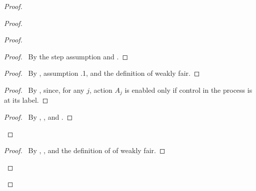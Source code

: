 \documentclass[fleqn,leqno]{article}
\begin{document}
\begin{proof}
\begin{proof}
\begin{proof}
    \begin{proof}
    \pf\ By the step  assumption and .
    \end{proof}
\vspace{.2em}

    \begin{proof}
    \pf\ By , assumption .1, and 
     the definition of weakly fair.
    \end{proof}

\vspace{.2em}
     \begin{proof}
     \pf\ By , since, for any $j$, action $A_{j}$ is enabled
    only if control in the process is at its label.
     \end{proof}
\vspace{.2em}
    \qedstep
      \begin{proof}
      \pf\ By , , and .
      \end{proof}

  \end{proof}
\vspace{.6em}

\qedstep
\vspace{.2em}
\begin{proof}
\pf\ By , , and the definition of of weakly fair.
\end{proof}
\end{proof}

\vspace{.6em}



\end{proof}
\end{document}
